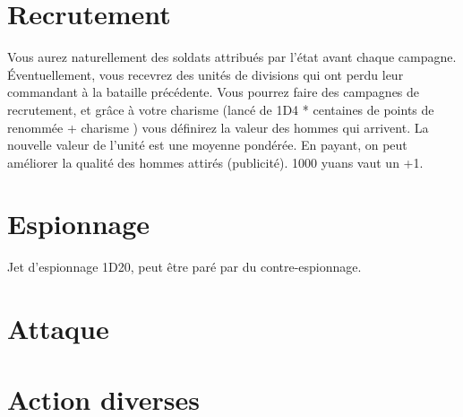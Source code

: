 \documentclass[french]{article}
\begin{document}
\section{Recrutement}

Vous aurez naturellement des soldats attribués par l'état avant chaque campagne. Éventuellement, vous recevrez des unités de divisions qui ont perdu leur commandant à la bataille précédente.
Vous pourrez faire des campagnes de recrutement, et grâce à votre charisme (lancé de 1D4 * centaines de points de renommée + charisme ) vous définirez la valeur des hommes qui arrivent. La nouvelle valeur de l'unité est une moyenne pondérée.
En payant, on peut améliorer la qualité des hommes attirés (publicité). 1000 yuans vaut un +1.

\section{Espionnage}

Jet d'espionnage 1D20, peut être paré par du contre-espionnage.

\section{Attaque}


\section{Action diverses}
\end{document}

